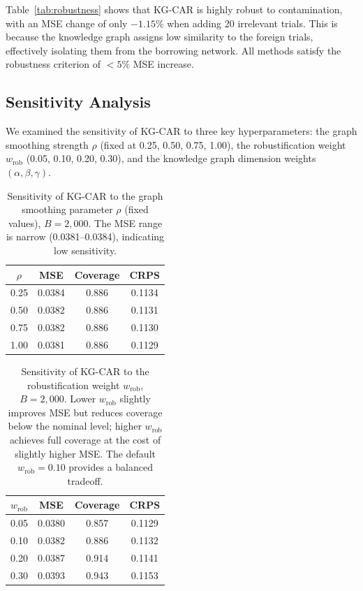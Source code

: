 \documentclass[12pt]{article}
\begin{document}
Table~\ref{tab:robustness} shows that KG-CAR is highly robust to contamination, with an MSE change of only $-1.15\%$ when adding 20 irrelevant trials. This is because the knowledge graph assigns low similarity to the foreign trials, effectively isolating them from the borrowing network. All methods satisfy the robustness criterion of $< 5\%$ MSE increase.

\subsection{Sensitivity Analysis}
\label{sec:sensitivity}

We examined the sensitivity of KG-CAR to three key hyperparameters: the graph smoothing strength $\rho$ (fixed at 0.25, 0.50, 0.75, 1.00), the robustification weight $w_{\text{rob}}$ (0.05, 0.10, 0.20, 0.30), and the knowledge graph dimension weights $(\alpha, \beta, \gamma)$.

\begin{table}[ht]
\centering
\caption{Sensitivity of KG-CAR to the graph smoothing parameter $\rho$ (fixed values), $B = 2{,}000$. The MSE range is narrow (0.0381--0.0384), indicating low sensitivity.}
\label{tab:sens_rho}
\begin{tabular}{cccc}
\toprule
$\rho$ & MSE & Coverage & CRPS \\
\midrule
0.25 & 0.0384 & 0.886 & 0.1134 \\
0.50 & 0.0382 & 0.886 & 0.1131 \\
0.75 & 0.0382 & 0.886 & 0.1130 \\
1.00 & 0.0381 & 0.886 & 0.1129 \\
\bottomrule
\end{tabular}
\end{table}

\begin{table}[ht]
\centering
\caption{Sensitivity of KG-CAR to the robustification weight $w_{\text{rob}}$, $B = 2{,}000$. Lower $w_{\text{rob}}$ slightly improves MSE but reduces coverage below the nominal level; higher $w_{\text{rob}}$ achieves full coverage at the cost of slightly higher MSE. The default $w_{\text{rob}} = 0.10$ provides a balanced tradeoff.}
\label{tab:sens_wrob}
\begin{tabular}{cccc}
\toprule
$w_{\text{rob}}$ & MSE & Coverage & CRPS \\
\midrule
0.05 & 0.0380 & 0.857 & 0.1129 \\
0.10 & 0.0382 & 0.886 & 0.1132 \\
0.20 & 0.0387 & 0.914 & 0.1141 \\
0.30 & 0.0393 & 0.943 & 0.1153 \\
\bottomrule
\end{tabular}
\end{table}
\end{document}
